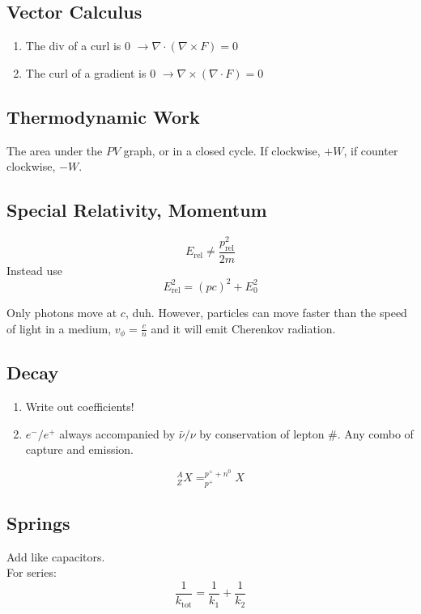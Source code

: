 \documentclass[10pt,a4paper]{article}
\begin{document}
\subsection{Vector Calculus}
\begin{enumerate}
    \item The div of a curl is 0 $\rightarrow \nabla \cdot (\nabla \times F) = 0$
    \item The curl of a gradient is 0 $\rightarrow \nabla \times (\nabla \cdot F)=0$
\end{enumerate}

\subsection{Thermodynamic Work}
The area under the $PV$ graph, or in a closed cycle. If clockwise, $+W$, if counter clockwise, $-W$. 

\subsection{Special Relativity, Momentum}
\begin{equation}
 E_{\textrm{rel}} \neq \frac{p^2_{\textrm{rel}}}{2m}
\end{equation}
Instead use
\begin{equation}
 E^2_{\textrm{rel}} = (pc)^2 + E_0^2
\end{equation}

Only photons move at $c$, duh. However, particles can move faster than the speed of light in a medium, $v_\phi = \frac{c}{n}$ and it will emit Cherenkov radiation.

\subsection{Decay}
\begin{enumerate}
    \item Write out coefficients!
    \item $e^-/e^+$ always accompanied by $\bar{\nu}/\nu$ by conservation of lepton \#. Any combo of capture and emission.
\end{enumerate}

\begin{equation}
 ^A_ZX = ^{p^+ + n^0}_{p^+}X 
\end{equation}

\subsection{Springs}
Add like capacitors.\\
For series:
\begin{equation}
    \frac{1}{k_{\textrm{tot}}} = \frac{1}{k_1} + \frac{1}{k_2}
\end{equation}
\end{document}

